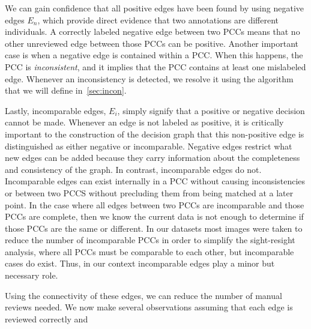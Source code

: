 We can gain confidence that all positive edges have been found by using negative edges $E_n$, which provide
  direct evidence that two annotations are different individuals.
A correctly labeled negative edge between two PCCs means that no other unreviewed edge between those PCCs can be
  positive.
Another important case is when a negative edge is contained within a PCC.
When this happens, the PCC is \emph{inconsistent}, and it implies that the PCC contains at least one mislabeled
  edge.
Whenever an inconsistency is detected, we resolve it using the algorithm that we will define in~\cref{sec:incon}.

Lastly, incomparable edges, $E_i$, simply signify that a positive or negative decision cannot be made.
Whenever an edge is not labeled as positive, it is critically important to the construction of the decision graph
  that this non-positive edge is distinguished as either negative or incomparable.
Negative edges restrict what new edges can be added because they carry information about the completeness and
  consistency of the graph.
In contrast, incomparable edges do not.
Incomparable edges can exist internally in a PCC without causing inconsistencies or between two PCCS without
  precluding them from being matched at a later point.
In the case where all edges between two PCCs are incomparable and those PCCs are complete, then we know the
  current data is not enough to determine if those PCCs are the same or different.
In our datasets most images were taken to reduce the number of incomparable PCCs in order to simplify the
  sight-resight analysis, where all PCCs must be comparable to each other, but incomparable cases do exist.
Thus, in our context incomparable edges play a minor but necessary role.



Using the connectivity of these edges, we can reduce the number of manual reviews needed.
We now make several observations assuming that each edge is reviewed correctly and

